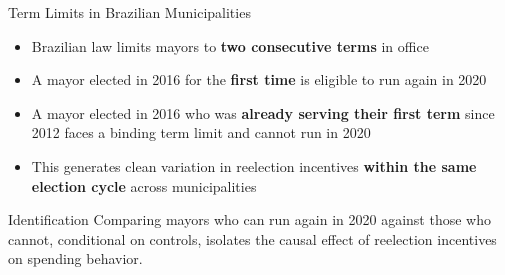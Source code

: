 \documentclass{beamer}
\begin{document}
\begin{frame}{Term Limits in Brazilian Municipalities}
\begin{itemize}
    \item Brazilian law limits mayors to \textbf{two consecutive terms} in office
    \vspace{0.5em}
    \item A mayor elected in 2016 for the \textbf{first time} is eligible to run again in 2020
    \vspace{0.5em}
    \item A mayor elected in 2016 who was \textbf{already serving their first term} since 2012 faces a binding term limit and cannot run in 2020
    \vspace{0.5em}
    \item This generates clean variation in reelection incentives \textbf{within the same election cycle} across municipalities
\end{itemize}
\begin{block}{Identification}
    Comparing mayors who can run again in 2020 against those who cannot, conditional on controls, isolates the causal effect of reelection incentives on spending behavior.
\end{block}
\end{frame}
\end{document}
